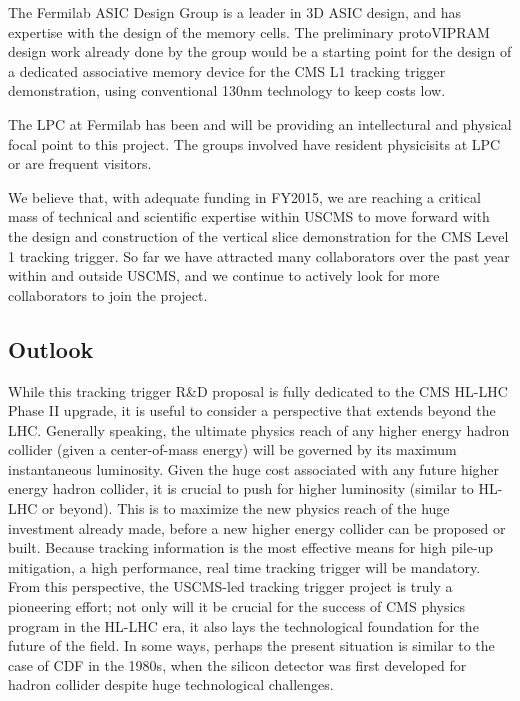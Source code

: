 The Fermilab ASIC Design Group is a leader in 3D ASIC design, and has expertise with the design of the memory cells.  The preliminary protoVIPRAM design work already done by the group would be a starting point for the design of a
dedicated associative memory device for the CMS L1 tracking trigger demonstration, using conventional 130nm technology to keep costs low.

The LPC at Fermilab has been and will be providing an intellectural and physical focal point to this project. The groups involved have resident physicisits at LPC or are frequent visitors. 

We believe that, with adequate funding in FY2015, we are reaching a critical mass of technical and scientific expertise within USCMS to move forward with the design and construction of the vertical slice demonstration for the CMS Level 1 tracking trigger. So far we have attracted many collaborators over the past year within and outside USCMS, 
and we continue to actively look for more collaborators to join the project.

\subsection{Outlook}

While this tracking trigger R\&D proposal is fully dedicated to the CMS HL-LHC Phase II upgrade, it is useful to consider a perspective that extends beyond the LHC.  Generally speaking, the ultimate physics reach of any higher energy hadron collider (given a center-of-mass energy) will be governed by its maximum instantaneous luminosity. Given the huge cost associated with any future higher energy hadron collider, it is crucial to push for higher luminosity (similar to HL-LHC or beyond). This is to maximize the new physics reach of the huge investment already made, before a new higher energy collider can be proposed or built. Because tracking information is the most effective means for high pile-up mitigation, a high performance, real time tracking trigger will be mandatory. From this perspective, the USCMS-led tracking trigger project is truly a pioneering effort; not only will it be crucial for the success of CMS physics program in the HL-LHC era, it also lays the technological foundation for the future of the field. In some ways, perhaps the present situation is similar to the case of CDF in the 1980s, when the silicon detector was first developed for hadron collider despite huge technological challenges.  




